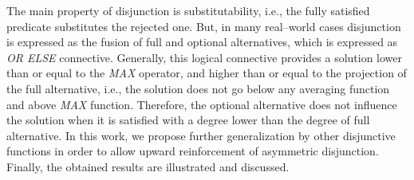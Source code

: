 
The main property of disjunction is substitutability, i.e., the fully satisfied predicate substitutes the rejected one. But, in many real--world cases disjunction is expressed as the fusion of full and optional alternatives, which is expressed as \textit{OR ELSE} connective. 
Generally, this logical connective provides a solution lower than or equal to the \textit{MAX} operator, and higher than or equal to the projection of the full alternative, i.e., the solution does not go below any averaging function and above \textit{MAX} function. Therefore, the optional alternative does not influence the solution when it is satisfied with a degree lower than the degree of full alternative. In this work, we propose further generalization by other disjunctive functions in order to allow upward reinforcement of asymmetric disjunction. Finally, the obtained results are illustrated and discussed.


